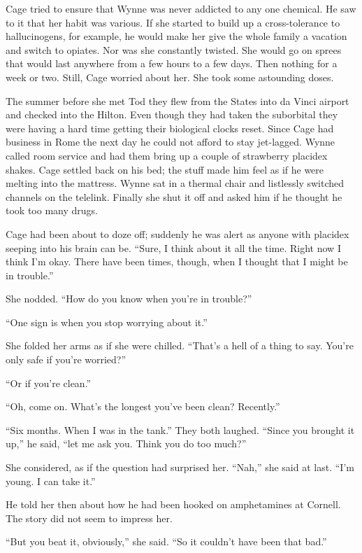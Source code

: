 Cage tried to ensure that Wynne was never addicted to any one chemical. He saw to it that her habit was various. If she started to build up a cross-tolerance to hallucinogens, for example, he would make her give the whole family a vacation and switch to opiates. Nor was she constantly twisted. She would go on sprees that would last anywhere from a few hours to a few days. Then nothing for a week or two. Still, Cage worried about her. She took some astounding doses.

The summer before she met Tod they flew from the States into da Vinci airport and checked into the Hilton. Even though they had taken the suborbital they were having a hard time getting their biological clocks reset. Since Cage had business in Rome the next day he could not afford to stay jet-lagged. Wynne called room service and had them bring up a couple of strawberry placidex shakes. Cage settled back on his bed; the stuff made him feel as if he were melting into the mattress. Wynne sat in a thermal chair and listlessly switched channels on the telelink. Finally she shut it off and asked him if he thought he took too many drugs.

Cage had been about to doze off; suddenly he was alert as anyone with placidex seeping into his brain can be. ``Sure, I think about it all the time. Right now I think I'm okay. There have been times, though, when I thought that I might be in trouble.''

She nodded. ``How do you know when you're in trouble?''

``One sign is when you stop worrying about it.''

She folded her arms as if she were chilled. ``That's a hell of a thing to say. You're only safe if you're worried?''

``Or if you're clean.''

``Oh, come on. What's the longest you've been clean? Recently.''

``Six months. When I was in the tank.'' They both laughed. ``Since you brought it up,'' he said, ``let me ask you. Think you do too much?''

She considered, as if the question had surprised her. ``Nah,'' she said at last. ``I'm young. I can take it.''

He told her then about how he had been hooked on amphetamines at Cornell. The story did not seem to impress her.

``But you beat it, obviously,'' she said. ``So it couldn't have been that bad.''

